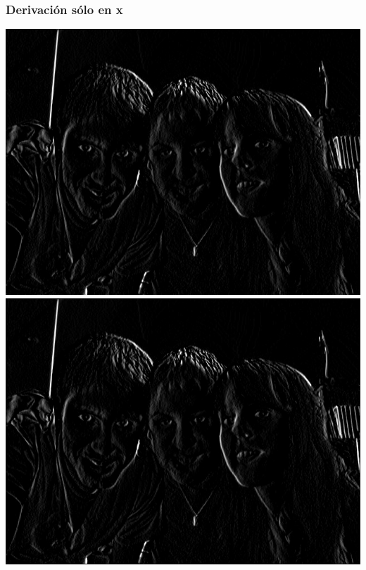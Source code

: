 \documentclass[a4paper, 10pt]{article}
\begin{document}
\subsubsection{Derivaci\'on s\'olo en x}
\begin{center}
	\includegraphics[scale=0.30]{Graficos/out/cvSobelX_foto3.jpg}
	\includegraphics[scale=0.30]{Graficos/out/sobelX_foto3.jpg}
\end{center}
\end{document}
